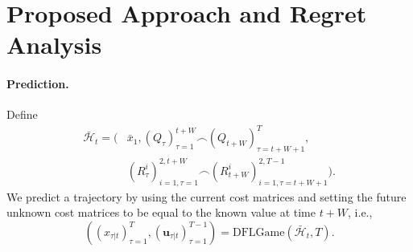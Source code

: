 \documentclass[letterpaper, 10 pt, conference]{ieeeconf}  %
\newtheorem{problem}{Problem}
\begin{document}




\section{Proposed Approach and Regret Analysis}
\paragraph{Prediction. } 
Define 
\begin{equation}
\begin{split}
    \bar{\mathcal{H}}_{t} = (&\bar{x}_{1}, (Q_{\tau})_{\tau=1}^{t+W} \frown(Q_{t+W})_{\tau=t+W+1}^{T},\\
    &(R_{\tau}^{i})_{i=1,\tau=1}^{2,t+W} \frown(R_{t+W}^{i})_{i=1,\tau=t+W+1}^{2,T-1}).
\end{split}
\end{equation}
We predict a trajectory by using the current cost matrices and setting the future unknown cost matrices to be equal to the known value at time $t+W$, i.e.,
\begin{equation}
    ((x_{\tau|t})_{\tau=1}^{T},(\mathbf{u}_{\tau|t})_{\tau=1}^{T-1}) = \text{DFLGame}(\bar{\mathcal{H}}_{t},T).
\end{equation}
\end{document}
